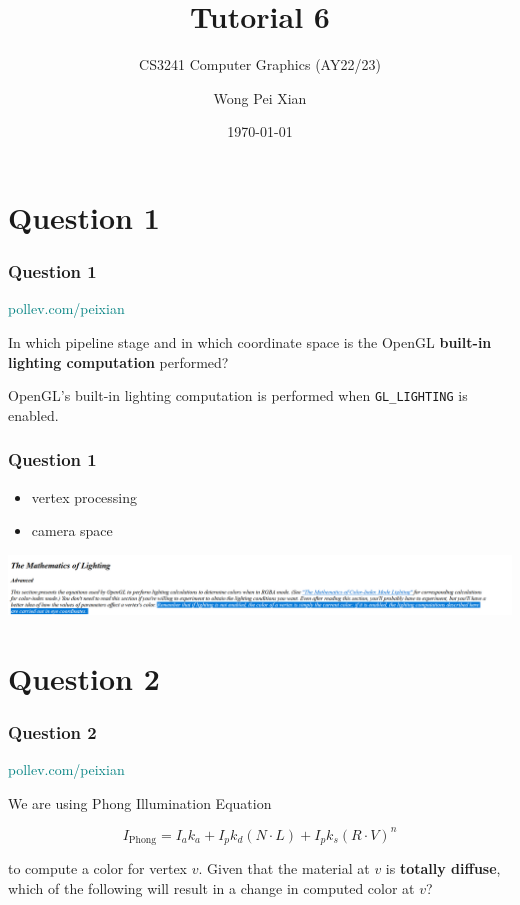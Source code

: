 \documentclass{beamer}
\title{Tutorial 6}
\subtitle{CS3241 Computer Graphics (AY22/23)}
\date{\today}
\author{Wong Pei Xian}
\institute[]{\email{e0389023@u.nus.edu}}
\begin{document}
\frame[plain]{\titlepage}

\section{Question 1}

\begin{frame}
    \frametitle{Question 1}

    \begin{tcolorbox}[colback=teal!5!white]
        \textcolor{teal}{pollev.com/peixian}
    \end{tcolorbox}

    \vspace*{1em}

    In which pipeline stage and in which coordinate space is the OpenGL 
    \textbf{built-in lighting computation} performed? 

    \begin{tcolorbox}
        OpenGL's built-in lighting computation is performed when
        \texttt{GL\_LIGHTING} is enabled.
    \end{tcolorbox}
\end{frame}

\begin{frame}
    \frametitle{Question 1}

    \begin{itemize}
        \item vertex processing
        \item camera space
    \end{itemize}
    
    \begin{center}
        \includegraphics[scale=0.3]{q1.png}
    \end{center}

\end{frame}

\section{Question 2}

\begin{frame}
    \frametitle{Question 2}

    \begin{tcolorbox}[colback=teal!5!white]
        \textcolor{teal}{pollev.com/peixian}
    \end{tcolorbox}

    We are using Phong Illumination Equation 

    \begin{equation*}
        I_\text{Phong} = I_a k_a + I_p k_d  (N \cdot L) + I_p k_s (R \cdot V)^n
    \end{equation*}

    to compute a color for vertex $v$. Given that the material at $v$ is 
    \textbf{totally diffuse}, which of the following will result in a change in computed color at $v$?

\end{frame}
\end{document}
